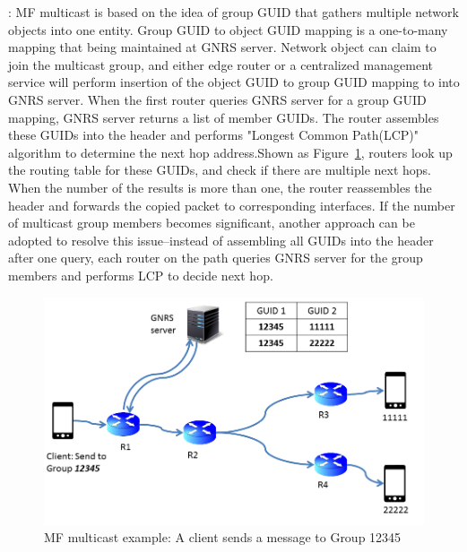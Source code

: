 \vspace{1mm}: MF multicast is based on the idea of group GUID that gathers multiple network objects into one entity. Group GUID  to object GUID mapping is a one-to-many mapping that being maintained at GNRS server. Network object can claim to join the multicast group, and either edge router or a centralized management service will perform insertion of the object GUID to group GUID mapping to into GNRS server. When the first router queries GNRS server for a group GUID mapping, GNRS server returns a list of member GUIDs. The router assembles these GUIDs into the header and performs "Longest Common Path(LCP)" algorithm to determine the next hop address.Shown as Figure~\ref{fig:multicast}, routers look up the routing table for these GUIDs, and check if there are multiple next hops. When the number of the results is more than one, the router reassembles the header and forwards the copied packet to corresponding interfaces. If the number of multicast group members becomes significant, another approach can be adopted to resolve this issue--instead of assembling all GUIDs into the header after one query, each router on the path queries GNRS server for the group members and performs LCP to decide next hop.
\begin{figure}
\centering
\includegraphics[width=\columnwidth]{figure/multicast.png}
\caption{\label{fig:multicast}MF multicast example: A client sends a message to Group 12345}
\end{figure}
